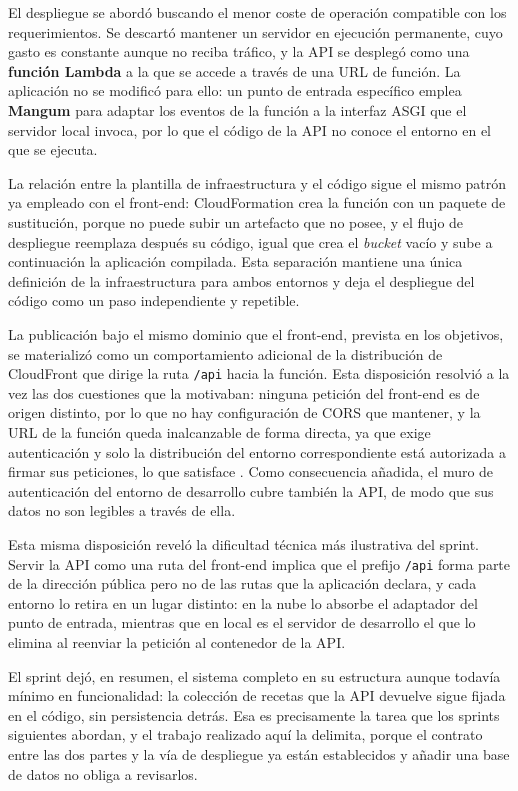 El despliegue se abordó buscando el menor coste de operación compatible con los
requerimientos. Se descartó mantener un servidor en ejecución permanente, cuyo
gasto es constante aunque no reciba tráfico, y la API se desplegó como una
\textbf{función Lambda} a la que se accede a través de una URL de función. La
aplicación no se modificó para ello: un punto de entrada específico emplea
\textbf{Mangum} para adaptar los eventos de la función a la interfaz ASGI que el
servidor local invoca, por lo que el código de la API no conoce el entorno en el
que se ejecuta.

La relación entre la plantilla de infraestructura y el código sigue el mismo
patrón ya empleado con el front-end: CloudFormation crea la función con un
paquete de sustitución, porque no puede subir un artefacto que no posee, y el
flujo de despliegue reemplaza después su código, igual que crea el \textit{bucket}
vacío y sube a continuación la aplicación compilada. Esta separación mantiene una
única definición de la infraestructura para ambos entornos y deja el despliegue
del código como un paso independiente y repetible.

La publicación bajo el mismo dominio que el front-end, prevista en los objetivos,
se materializó como un comportamiento adicional de la distribución de CloudFront
que dirige la ruta \texttt{/api} hacia la función. Esta disposición resolvió a la
vez las dos cuestiones que la motivaban: ninguna petición del front-end es de
origen distinto, por lo que no hay configuración de CORS que mantener, y la URL
de la función queda inalcanzable de forma directa, ya que exige autenticación y
solo la distribución del entorno correspondiente está autorizada a firmar sus
peticiones, lo que satisface . Como consecuencia añadida, el
muro de autenticación del entorno de desarrollo cubre también la API, de modo que
sus datos no son legibles a través de ella.

Esta misma disposición reveló la dificultad técnica más ilustrativa del sprint.
Servir la API como una ruta del front-end implica que el prefijo \texttt{/api}
forma parte de la dirección pública pero no de las rutas que la aplicación
declara, y cada entorno lo retira en un lugar distinto: en la nube lo absorbe el
adaptador del punto de entrada, mientras que en local es el servidor de
desarrollo el que lo elimina al reenviar la petición al contenedor de la API.

El sprint dejó, en resumen, el sistema completo en su estructura aunque todavía
mínimo en funcionalidad: la colección de recetas que la API devuelve sigue fijada
en el código, sin persistencia detrás. Esa es precisamente la tarea que los
sprints siguientes abordan, y el trabajo realizado aquí la delimita, porque el
contrato entre las dos partes y la vía de despliegue ya están establecidos y
añadir una base de datos no obliga a revisarlos.

